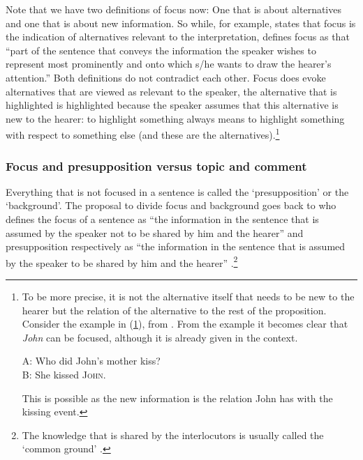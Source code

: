 Note that we have two definitions of focus now: One that is about alternatives and one that is about new information. So while, for example, \citet[18]{krifka2007basic} states that focus is the indication of alternatives relevant to the interpretation, \citet[1876]{hinterwimmer2011formation} defines focus as that ``part of the sentence that conveys the information the speaker wishes to represent most prominently and onto which s/he wants to draw the hearer's attention.'' Both definitions do not contradict each other. Focus does evoke alternatives that are viewed as relevant to the speaker, the alternative that is highlighted is highlighted because the speaker assumes that this alternative is new to the hearer: to highlight something always means to highlight something with respect to something else (and these are the alternatives).\footnote{ To be more precise, it is not the alternative itself that needs to be new to the hearer but the relation of the alternative to the rest of the proposition. Consider the example in (\ref{kissmotherrelation}), from \citet[55]{rochemont2016givenness}. From the example it becomes clear that \textit{John} can be focused, although it is already given in the context.

\begin{exe}
\ex A: Who did John's mother kiss? \\
B: She kissed \textsc{John}. \label{kissmotherrelation}
\end{exe}

\noindent This is possible as the new information is the relation John has with the kissing event.

}

\subsubsection{Focus and presupposition versus topic and comment}
Everything that is not focused in a sentence is called the `presupposition' or the `background'. The proposal to divide focus and background goes back to \citet{jackendoff1972semantic} who defines the focus of a sentence as ``the information in the sentence that is assumed by the speaker not to be shared by him and the hearer'' and presupposition respectively as ``the information in the sentence that is assumed by the speaker to be shared by him and the hearer'' \citep[230]{jackendoff1972semantic}.\footnote{ The knowledge that is shared by the interlocutors is usually called the `common ground' \citep{stalnaker1978assertion}.}

